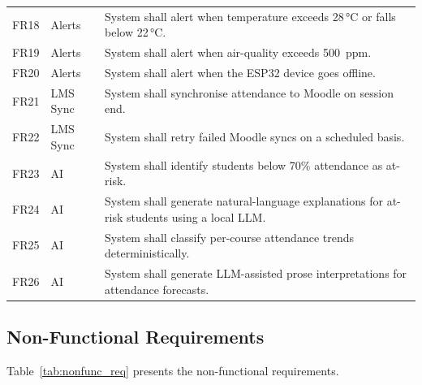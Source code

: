 \begin{table}[H]
\begin{tabular}{@{}p{0.7cm}p{2.2cm}p{4.6cm}@{}}
\midrule
FR18 & Alerts      & System shall alert when temperature exceeds 28\,°C or falls below 22\,°C. \\
FR19 & Alerts      & System shall alert when air-quality exceeds 500~ppm. \\
FR20 & Alerts      & System shall alert when the ESP32 device goes offline. \\
\midrule
FR21 & LMS Sync    & System shall synchronise attendance to Moodle on session end. \\
FR22 & LMS Sync    & System shall retry failed Moodle syncs on a scheduled basis. \\
\midrule
FR23 & AI          & System shall identify students below 70\% attendance as at-risk. \\
FR24 & AI          & System shall generate natural-language explanations for at-risk students using a local LLM. \\
FR25 & AI          & System shall classify per-course attendance trends deterministically. \\
FR26 & AI          & System shall generate LLM-assisted prose interpretations for attendance forecasts. \\
\bottomrule
\end{tabular}
\end{table}

\subsection{Non-Functional Requirements}
\label{subsec:nonfunc_req}

Table~\ref{tab:nonfunc_req} presents the non-functional requirements.

